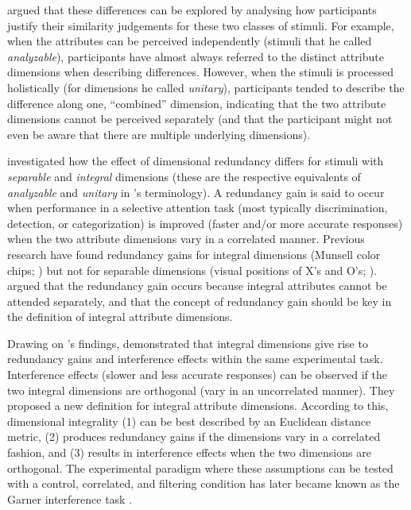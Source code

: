 \documentclass[11pt,a4paper]{article}
\begin{document}
 argued that these differences can be explored by analysing how participants justify their similarity judgements for these two classes of stimuli. For example, when the attributes can be perceived independently (stimuli that he called \textit{analyzable}), participants have almost always referred to the distinct attribute dimensions when describing differences. However, when the stimuli is processed holistically (for dimensions he called \textit{unitary}), participants tended to describe the difference along one, ``combined'' dimension, indicating that the two attribute dimensions cannot be perceived separately (and that the participant might not even be aware that there are multiple underlying dimensions). 

 investigated how the effect of dimensional redundancy differs for stimuli with \textit{separable} and \textit{integral} dimensions (these are the respective equivalents of \textit{analyzable} and \textit{unitary} in \citeauthor{Shepard1964}'s terminology). A redundancy gain is said to occur when performance in a selective attention task (most typically discrimination, detection, or categorization) is improved (faster and/or more accurate responses) when the two attribute dimensions vary in a correlated manner. Previous research have found redundancy gains for integral dimensions (Munsell color chips; ) but not for separable dimensions (visual positions of X's and O's; ). \citeauthor{Lockhead1966} argued that the redundancy gain occurs because integral attributes cannot be attended separately, and that the concept of redundancy gain should be key in the definition of integral attribute dimensions. 

Drawing on  \citeauthor{Lockhead1966}'s findings,  demonstrated that integral dimensions give rise to redundancy gains and interference effects within the same experimental task. Interference effects  (slower and less accurate responses) can be observed if the two integral dimensions are orthogonal (vary in an uncorrelated manner). They proposed a new definition for integral attribute dimensions. According to this, dimensional integrality (1) can be best described by an Euclidean distance metric, (2) produces redundancy gains if the dimensions vary in a correlated fashion, and (3) results in interference effects when the two dimensions are orthogonal. The experimental paradigm where these assumptions can be tested with a control, correlated, and filtering condition has later became known as the Garner interference task \cite{Burns2014}.
\end{document}

